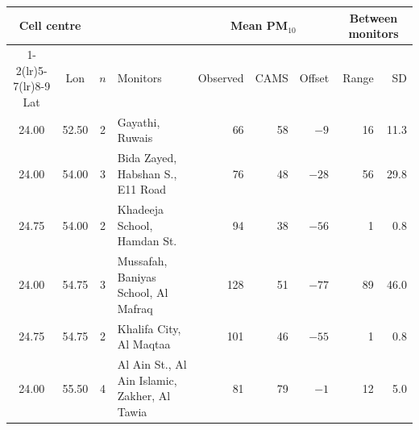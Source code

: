 \begin{tabular}{ccclrrrrr}\toprule
\multicolumn{2}{c}{Cell centre} & & & \multicolumn{3}{c}{Mean PM$_{10}$} & \multicolumn{2}{c}{Between monitors} \\ \cmidrule(lr){1-2}\cmidrule(lr){5-7}\cmidrule(lr){8-9}
Lat & Lon & $n$ & Monitors & Observed & CAMS & Offset & Range & SD \\ \midrule
24.00 & 52.50 & 2 & Gayathi, Ruwais & 66 & 58 & $-9$ & 16 & 11.3 \\
24.00 & 54.00 & 3 & Bida Zayed, Habshan S., E11 Road & 76 & 48 & $-28$ & 56 & 29.8 \\
24.75 & 54.00 & 2 & Khadeeja School, Hamdan St. & 94 & 38 & $-56$ & 1 & 0.8 \\
24.00 & 54.75 & 3 & Mussafah, Baniyas School, Al Mafraq & 128 & 51 & $-77$ & 89 & 46.0 \\
24.75 & 54.75 & 2 & Khalifa City, Al Maqtaa & 101 & 46 & $-55$ & 1 & 0.8 \\
24.00 & 55.50 & 4 & Al Ain St., Al Ain Islamic, Zakher, Al Tawia & 81 & 79 & $-1$ & 12 & 5.0 \\
\bottomrule\end{tabular}
